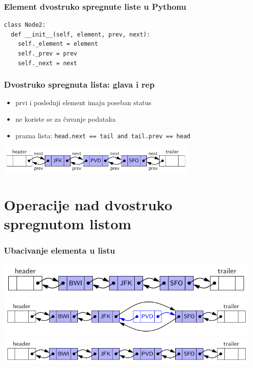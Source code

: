 \documentclass[compress,aspectratio=169]{beamer}
\begin{document}
\begin{frame}[fragile]
  \frametitle{Element dvostruko spregnute liste u Pythonu}
\begin{verbatim}
class Node2:
  def __init__(self, element, prev, next):
    self._element = element
    self._prev = prev
    self._next = next
\end{verbatim}
\end{frame}

\begin{frame}[fragile]
  \frametitle{Dvostruko spregnuta lista: glava i rep}
  \begin{itemize}
    \item prvi i poslednji element imaju poseban status
    \item ne koriste se za čuvanje podataka
    \item prazna lista: \texttt{head.next == tail and tail.prev == head}
  \end{itemize}
  \begin{center}
    \includegraphics[width=10cm]{asp-07-pic07.pdf}
  \end{center}
\end{frame}

\section[Operacije]{Operacije nad dvostruko spregnutom listom}
\begin{frame}[fragile]
  \frametitle{Ubacivanje elementa u listu}
  \begin{center}
    \includegraphics[scale=0.9]{asp-07-pic08a.pdf} \\
    \includegraphics[scale=0.9]{asp-07-pic08b.pdf} \\
    \includegraphics[scale=0.9]{asp-07-pic08c.pdf}
  \end{center}
\end{frame}
\end{document}
